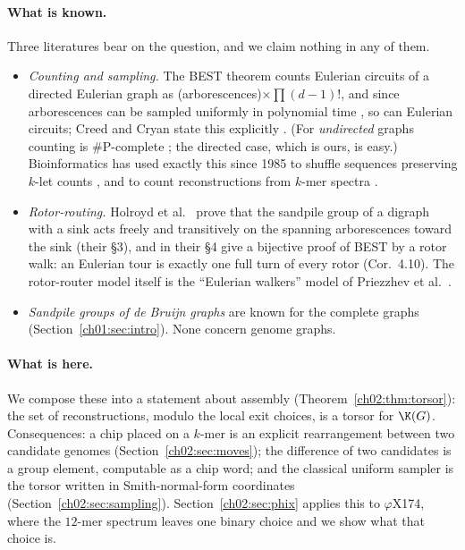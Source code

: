 \paragraph{What is known.} Three literatures bear on the question, and we claim nothing in
any of them.
\begin{itemize}
\item \emph{Counting and sampling.} The BEST theorem \cite{BEST,SmithTutte} counts Eulerian
circuits of a directed Eulerian graph as (arborescences)$\times\prod(d-1)!$, and since
arborescences can be sampled uniformly in polynomial time \cite{CMN,PW,Wilson}, so can
Eulerian circuits; Creed and Cryan state this explicitly \cite{CC}. (For \emph{undirected}
graphs counting is $\#$P-complete \cite{BW}; the directed case, which is ours, is easy.)
Bioinformatics has used exactly this since 1985 to shuffle sequences preserving $k$-let
counts \cite{AE,KMUW,uShuffle}, and to count reconstructions from $k$-mer spectra
\cite{ABCS,KSP}.
\item \emph{Rotor-routing.} Holroyd et al.\ \cite{HLMPPW} prove that the sandpile group of a
digraph with a sink acts freely and transitively on the spanning arborescences toward the
sink (their \S3), and in their \S4 give a bijective proof of BEST by a rotor walk: an
Eulerian tour is exactly one full turn of every rotor (Cor.~4.10). The rotor-router model
itself is the ``Eulerian walkers'' model of Priezzhev et al.\ \cite{PDDK}.
\item \emph{Sandpile groups of de Bruijn graphs} are known for the complete graphs
\cite{Levine,BidkhoriKishore,CHP} (Section~\ref{ch01:sec:intro}). None concern genome graphs.
\end{itemize}

\paragraph{What is here.} We compose these into a statement about assembly
(Theorem~\ref{ch02:thm:torsor}): the set of reconstructions, modulo the local exit choices, is
a torsor for $\K(G)$. Consequences: a chip placed on a $k$-mer is an explicit
rearrangement between two candidate genomes (Section~\ref{ch02:sec:moves}); the difference of
two candidates is a group element, computable as a chip word; and the classical uniform
sampler is the torsor written in Smith-normal-form coordinates
(Section~\ref{ch02:sec:sampling}). Section~\ref{ch02:sec:phix} applies this to $\varphi$X174, where
the $12$-mer spectrum leaves one binary choice and we show what that choice is.


